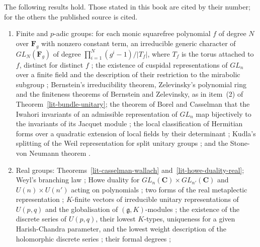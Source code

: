 
\begin{theorem}\label{lit-bundle-theta}
The following results hold. Those stated in this book are cited by their
number; for the others the published source is cited.
\begin{enumerate}
\item Finite and $p$-adic groups: for each monic squarefree polynomial $f$ of
  degree $N$ over $\mathbf F_g$ with nonzero constant term, an irreducible
  generic character of $GL_N(\mathbf F_g)$ of degree
  $\prod_{i=1}^N(g^i-1)/|T_f|$, where $T_f$ is the torus attached to $f$,
  distinct for distinct $f$ \cite{Gre55}; the existence of cuspidal
  representations of $GL_n$ over a finite field and the description of their
  restriction to the mirabolic subgroup \cite{Gel70,Zel81}; Bernstein's
  irreducibility theorem, Zelevinsky's polynomial ring and the finiteness
  theorems of Bernstein and Zelevinsky, as in item~(2) of
  Theorem~\ref{lit-bundle-unitary}; the theorem of Borel and Casselman that
  the Iwahori invariants of an admissible representation of $GL_n$ map
  bijectively to the invariants of its Jacquet module \cite{Bor76}; the local
  classification of Hermitian forms over a quadratic extension of local
  fields by their determinant \cite{Jac62}; Kudla's splitting of the Weil
  representation for split unitary groups \cite{Kud94}; and the Stone-von
  Neumann theorem \cite[Chapitre~2]{MVW87}.
\item Real groups: Theorems~\ref{lit-casselman-wallach}
  and~\ref{lit-howe-duality-real}; Weyl's branching law
  \cite[Chapter~8]{GW09}; Howe duality for
  $GL_n(\mathbf C)\times GL_{n'}(\mathbf C)$ and $U(n)\times U(n')$ acting on
  polynomials \cite{How89b}; two forms of the real metaplectic representation
  \cite{Wei64}; $K$-finite vectors of irreducible unitary representations of
  $U(p,q)$ and the globalisation of $(\mathfrak g,K)$-modules \cite{HC53}; the
  existence of the discrete series of $U(p,q)$, their lowest $K$-types,
  uniqueness for a given Harish-Chandra parameter, and the lowest weight
  description of the holomorphic discrete series
  \cite{HC56,HC66,Sch75}; their formal degrees \cite{HC66,HII08};

\end{enumerate}
\end{theorem}

